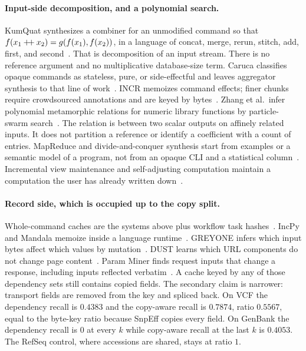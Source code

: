 \documentclass[letterpaper,twocolumn,10pt]{article}
\begin{document}
\paragraph{Input-side decomposition, and a polynomial search.}
KumQuat synthesizes a combiner for an unmodified command so that $f(x_1 \mathbin{+\kern-0.2em+} x_2) = g(f(x_1), f(x_2))$, in a language of concat, merge, rerun, stitch, add, first, and second~\cite{shen2022kumquat}.
That is decomposition of an input stream.
There is no reference argument and no multiplicative database-size term.
Caruca classifies opaque commands as stateless, pure, or side-effectful and leaves aggregator synthesis to that line of work~\cite{lamprou2025caruca}.
INCR memoizes command effects; finer chunks require crowdsourced annotations and are keyed by bytes~\cite{xie2026incr}.
Zhang et al.\ infer polynomial metamorphic relations for numeric library functions by particle-swarm search~\cite{zhang2014mri}.
The relation is between two scalar outputs on affinely related inputs.
It does not partition a reference or identify a coefficient with a count of entries.
MapReduce and divide-and-conquer synthesis start from examples or a semantic model of a program, not from an opaque CLI and a statistical column~\cite{smith2016mapreduce,farzan2017divide}.
Incremental view maintenance and self-adjusting computation maintain a computation the user has already written down~\cite{blakeley1986views,acar2003selective}.

\paragraph{Record side, which is occupied up to the copy split.}
Whole-command caches are the systems above plus workflow task hashes~\cite{ditommaso2017nextflow,molder2021snakemake,cromwell-call-cache}.
IncPy and Mandala memoize inside a language runtime~\cite{guo2011incpy,makelov2024mandala}.
GREYONE infers which input bytes affect which values by mutation~\cite{gan2020greyone}.
DUST learns which URL components do not change page content~\cite{baryossef2007dust}.
Param Miner finds request inputs that change a response, including inputs reflected verbatim~\cite{kettle2018paramminer}.
A cache keyed by any of those dependency sets still contains copied fields.
The secondary claim is narrower: transport fields are removed from the key and spliced back.
On VCF the dependency recall is
$0.4383$
and the copy-aware recall is
$0.7874$,
ratio
$0.5567$,
equal to the byte-key ratio because SnpEff copies every field.
On GenBank the dependency recall is
$0$
at every $k$ while copy-aware recall at the last $k$ is
$0.4053$.
The RefSeq control, where accessions are shared, stays at ratio
$1$.
\end{document}
